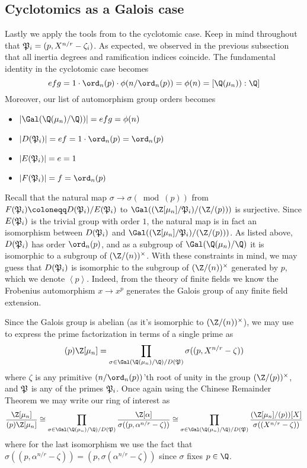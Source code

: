 \subsection{Cyclotomics as a Galois case}

Lastly we apply the tools from  to the cyclotomic case.
Keep in mind throughout that $\mathfrak{P}_i=(p,X^{n/r}-\zeta_i)$.
As expected, we observed in the previous subsection that all inertia degrees and ramification indices coincide.
The fundamental identity in the cyclotomic case becomes
\begin{equation}
    efg = 1\cdot\ord_n(p)\cdot\phi(n/\ord_n(p)) = \phi(n) = [\Q(\mu_n)):\Q]
\end{equation}
Moreover, our list of automorphism group orders becomes
\begin{itemize}
    \item
    $|\Gal(\Q(\mu_n)/\Q))|=efg=\phi(n)$
    \item
    $|D(\i{P}_i)|=ef=1\cdot\ord_n(p)=\ord_n(p)$
    \item
    $|E(\mathfrak{P}_i)|=e=1$
    \item
    $|F(\i{P}_i)|=f=\ord_n(p)$
\end{itemize}
Recall that the natural map $\sigma\to\sigma(\bmod(p))$ from $F(\i{P}_i)\coloneqq D(\i{P}_i)/E(\i{P}_i)$ to $\Gal((\Z[\mu_n]/\i{P}_i)/(\Z/(p)))$ is surjective.
Since $E(\mathfrak{P}_i)$ is the trivial group with order $1$, the natural map is in fact an isomorphism between $D(\mathfrak{P}_i)$ and $\Gal((\Z[\mu_n]/\i{P}_i)/(\Z/(p)))$.
As listed above, $D(\mathfrak{P}_i)$ has order $\ord_n(p)$, and as a subgroup of $\Gal(\Q(\mu_n)/\Q)$ it is isomorphic to a subgroup of $(\Z/(n))^\times$.
With these constraints in mind, we may guess that $D(\mathfrak{P}_i)$ is isomorphic to the subgroup of $(\Z/(n))^\times$ generated by $p$, which we denote $\left<p\right>$.
Indeed, from the theory of finite fields we know the Frobenius automorphism $x\to x^p$ generates the Galois group of any finite field extension.

Since the Galois group is abelian (as it's isomorphic to $(\Z/(n))^\times$), we may use  to express the prime factorization in terms of a single prime as
\begin{equation}
    (p)\Z[\mu_n] =
    \prod_{\sigma\in\Gal(\Q(\mu_n)/\Q)/D(\i{P})} \sigma((p,X^{n/r}-\zeta))
\end{equation}
where $\zeta$ is any primitive $(n/\ord_n(p))$'th root of unity in the group $(\Z/(p))^\times$, and $\mathfrak{P}$ is any of the primes $\mathfrak{P}_i$.
Once again using the Chinese Remainder Theorem we may write our ring of interest as
\begin{equation}
    \frac{\Z[\mu_n]}{(p)\Z[\mu_n]}
    \cong\prod_{\sigma\in\Gal(\Q(\mu_n)/\Q)/D(\i{P})}
        \frac{\Z[\alpha]}{\sigma((p,\alpha^{n/r}-\zeta))}
    \cong\prod_{\sigma\in\Gal(\Q(\mu_n)/\Q)/D(\i{P})}
        \frac{(\Z[\mu_n]/(p))[X]}{\sigma((X^{n/r}-\zeta))}
\end{equation}
where for the last isomorphism we use the fact that $\sigma((p,\alpha^{n/r}-\zeta))=(p,\sigma(\alpha^{n/r}-\zeta))$ since $\sigma$ fixes $p\in\Q$.
